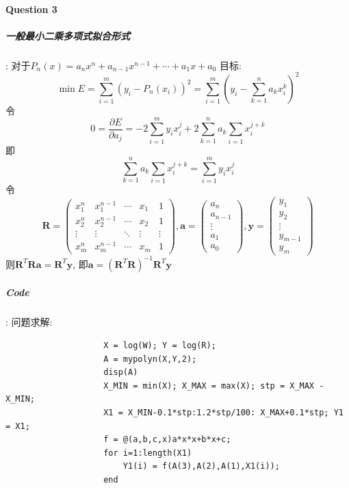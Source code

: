 \documentclass{article}
\begin{document}
\begin{CJK*}{UTF8}{song}
			\paragraph{Question 3}
				\subparagraph{一般最小二乘多项式拟合形式}
				:\newline
					对于$P_n\left(x\right) = a_n x^n + a_{n-1} x^{n-1} + \cdots + a_1 x + a_0$
					目标:
					$$\min E = \sum\limits_{i=1}^{m} \left(y_i - P_n\left(x_i \right)\right)^2 = \sum\limits_{i=1}^{m}\left(y_i - \sum\limits_{k=1}^{n} a_k x_i^k\right)^2 $$
					令
					$$0 = \frac{\partial E}{\partial a_j} = -2\sum\limits_{i=1}^{m}y_i x_i^j + 2\sum\limits_{k=1}^{n}a_k \sum\limits_{i=1}x_i^{j+k} $$
					即
					$$ \sum\limits_{k=1}^{n}a_k \sum\limits_{i=1}x_i^{j+k} =\sum\limits_{i=1}^{m}y_i x_i^j $$
					令
					$$\mathbf{R} = \left(\begin{matrix}
						x_1^n  & x_1^{n-1} & \cdots & x_1 & 1 \\
						x_2^n  & x_2^{n-1} & \cdots & x_2 & 1 \\
						\vdots & \vdots    & \ddots & \vdots & \vdots \\
						x_m^n  & x_m^{n-1} & \cdots & x_m & 1
					\end{matrix} \right),
					\mathbf{a} = \left(\begin{matrix}
						a_n \\
						a_{n-1} \\
						\vdots \\
						a_{1} \\
						a_{0} 
					\end{matrix}\right),
					\mathbf{y} = \left(\begin{matrix}
						y_1 \\
						y_{2} \\
						\vdots \\
						y_{m-1} \\
						y_m
					\end{matrix}\right)
					$$
					则$\mathbf{R}^T \mathbf{Ra} = \mathbf{R}^T \mathbf{y}$, 即$\mathbf{a} = \left(\mathbf{R}^T \mathbf{R}\right)^{-1} \mathbf{R}^T \mathbf{y}$
				\subparagraph{Code}
					:\newline
					问题求解:
					\begin{lstlisting}
					X = log(W); Y = log(R);
					A = mypolyn(X,Y,2);
					disp(A)
					X_MIN = min(X); X_MAX = max(X); stp = X_MAX - X_MIN;
					X1 = X_MIN-0.1*stp:1.2*stp/100: X_MAX+0.1*stp; Y1 = X1;
					f = @(a,b,c,x)a*x*x+b*x+c;
					for i=1:length(X1)
						Y1(i) = f(A(3),A(2),A(1),X1(i));
					end

\end{lstlisting}
\end{CJK*}
\end{document}
